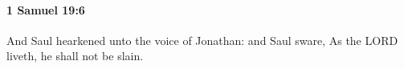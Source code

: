 
		\paragraph{1 Samuel 19:6} %
			\label{1SAMUEL-19-6}

			And Saul hearkened unto the voice of Jonathan: and Saul sware, As the LORD liveth, he shall not be slain.


